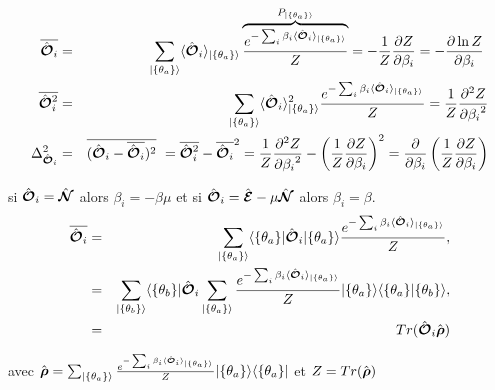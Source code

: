	\begin{eqnarray}
		\overline{\operator{\mathcal{O}}_i } & = & \sum_{\vert \{\theta_a \} \rangle} 	\langle \operator{\mathcal{O}}_i \rangle_{\vert \{\theta_a \} \rangle} \overbrace{\frac{e^{-\sum_i \beta_i \langle \operator{\mathcal{O}}_i \rangle_{\vert \{\theta_a \} \rangle} }}{Z}}^{P_{\vert \{\theta_a \} \rangle}} = - \frac{1}{Z}\frac{ \partial Z }{ \partial \beta_i } =  - \frac{ \partial \ln Z }{ \partial \beta_i } \\
		\overline{\operator{\mathcal{O}}_i^2 } & = & \sum_{\vert \{\theta_a \} \rangle} 	\langle \operator{\mathcal{O}}_i \rangle_{\vert \{\theta_a \} \rangle}^2 \frac{e^{-\sum_i \beta_i \langle \operator{\mathcal{O}}_i \rangle_{\vert \{\theta_a \} \rangle} }}{Z} = \frac{1}{Z} \frac{ \partial^2 Z }{ {\partial \beta_i}^2 }\\
		\Delta_{\operator{\mathcal{O}}_i}^2  & = & 	\overline{(\operator{\mathcal{O}}_i - \overline{\operator{\mathcal{O}}_i})^2 }  = 	\overline{\operator{\mathcal{O}}_i^2 }  -  \overline{\operator{\mathcal{O}}_i }^2 = \frac{1}{Z} \frac{ \partial^2 Z }{ {\partial \beta_i}^2 } - \left ( \frac{1}{Z}\frac{ \partial Z }{ \partial \beta_i }\right )^2 = \frac{\partial}{\partial \beta_i } \left ( \frac{1}{Z} \frac{\partial Z}{\partial \beta_i } \right )	
	\end{eqnarray}
	
	si $\hat{\bm{\mathcal{O}}}_i = \hat{\bm{\mathcal{N}}}$ alors $\beta_i = - \beta \mu $ et si $\hat{\bm{\mathcal{O}}}_i = \hat{\bm{\mathcal{E}}} - \mu \hat{\bm{\mathcal{N}}} $ alors $\beta_i = \beta$.\\
	
	\begin{eqnarray}
		\overline{\hat{\bm{\mathcal{O}}}_i } & = & 	\sum_{\vert \{\theta_a \} \rangle} 	\langle \{\theta_a \}  \vert \hat{\bm{\mathcal{O}}}_i \vert \{\theta_a \}  \rangle \frac{e^{-\sum_i \beta_i \langle \hat{\bm{\mathcal{O}}}_i \rangle_{\vert \{\theta_a \} \rangle} }}{Z},\\
		& = & 	\sum_{\vert \{\theta_b \} \rangle} \langle \{\theta_b \}  \vert  \hat{\bm{\mathcal{O}}}_i \sum_{\vert \{\theta_a \} \rangle }\frac{e^{-\sum_i \beta_i \langle \hat{\bm{\mathcal{O}}}_i \rangle_{\vert \{\theta_a \} \rangle} }}{Z} \vert \{\theta_a \}  \rangle  	\langle \{\theta_a \}  \vert  \{\theta_b \}  \rangle ,\\
		& = & Tr (  \hat{\bm{\mathcal{O}}}_i \hat{\bm{\rho}}) 
	\end{eqnarray}
	
	avec $\hat{\bm{\rho}} = \sum_{\vert \{\theta_a \} \rangle }\frac{e^{-\sum_i \beta_i \langle \hat{\bm{\mathcal{O}}}_i \rangle_{\vert \{\theta_a \} \rangle} }}{Z} \vert \{\theta_a \}  \rangle   	\langle \{\theta_a \} \vert $ et $Z = Tr (  \hat{\bm{\rho}}) $\\

